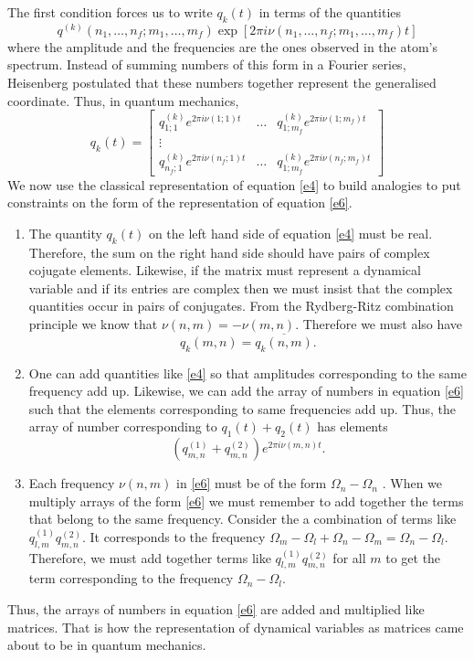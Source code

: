 \documentclass{article}
\begin{document}
The first condition forces us to write $q_k(t)$ in terms of the quantities
\begin{equation}\label{e5}
q^{(k)}(n_1, \ldots, n_f;m_1, \ldots, m_f)
\exp\left[2\pi i\nu(n_1,\ldots,n_f;m_1,\ldots, m_f)t\right]
\end{equation}
where the amplitude and the frequencies are the ones observed in the atom's
spectrum. Instead of summing numbers of this form in a Fourier series, 
Heisenberg postulated that these numbers together represent the generalised
coordinate. Thus, in quantum mechanics,
\begin{equation}\label{e6}
q_k(t) = \begin{bmatrix}
q^{(k)}_{1;1}e^{2\pi i\nu(1;1)t} & \ldots &q^{(k)}_{1;m_f}e^{2\pi i\nu(1;m_f)t}
\\
\vdots & \\
q^{(k)}_{n_f;1}e^{2\pi i\nu(n_f;1)t} & \ldots &q^{(k)}_{1;m_f}
e^{2\pi i\nu(n_f;m_f)t}
\end{bmatrix}
\end{equation}
We now use the classical representation of equation \eqref{e4} to build 
analogies to put constraints on the form of the representation of equation
\eqref{e6}.
\begin{enumerate}
\item The quantity $q_k(t)$ on the left hand side of equation \eqref{e4} must
be real. Therefore, the sum on the right hand side should have pairs of 
complex cojugate elements. Likewise, if the matrix must represent a dynamical 
variable and if its entries are complex then we must insist that the complex 
quantities occur in pairs of conjugates. From the Rydberg-Ritz combination
principle we know that $\nu(n, m) = -\nu(m, n)$. Therefore we must also have
\begin{equation}\label{e7}
q_k(m, n) = \overline{q_k(n, m)}.
\end{equation}

\item One can add quantities like \eqref{e4} so that amplitudes corresponding
to the same frequency add up. Likewise, we can add the array of numbers in 
equation \eqref{e6} such that the elements corresponding to same frequencies 
add up. Thus, the array of number corresponding to $q_1(t) + q_2(t)$ has 
elements
\begin{equation}\label{e8}
(q^{(1)}_{m, n} + q^{(2)}_{m, n})e^{2\pi i\nu(m, n)t}.
\end{equation}

\item Each frequency $\nu(n, m)$ in \eqref{e6} must be of the form $\Omega_n
- \Omega_n$ \cite{dirac1925fundamental}. When we multiply arrays of the form
\eqref{e6} we must remember to add together the terms that belong to the
same frequency. Consider the a combination of terms like $q^{(1)}_{l, m}
q^{(2)}_{m, n}$. It corresponds to the frequency $\Omega_m - \Omega_l + \Omega_n
- \Omega_m = \Omega_n - \Omega_l$. Therefore, we must add together terms like
$q^{(1)}_{l, m}q^{(2)}_{m, n}$ for all $m$ to get the term corresponding to
the frequency $\Omega_n - \Omega_l$.
\end{enumerate}
Thus, the arrays of numbers in equation \eqref{e6} are added and multiplied like
matrices. That is how the representation of dynamical variables as matrices
came about to be in quantum mechanics.


\end{document}
